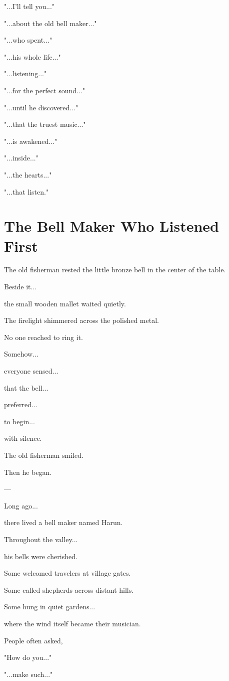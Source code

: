 \documentclass[12pt,openany]{book}
\begin{document}
"...I'll tell you..."

"...about the old bell maker..."

"...who spent..."

"...his whole life..."

"...listening..."

"...for the perfect sound..."

"...until he discovered..."

"...that the truest music..."

"...is awakened..."

"...inside..."

"...the hearts..."

"...that listen."
\section*{The Bell Maker Who Listened First}

The old fisherman rested the little bronze bell in the center of the table.

Beside it...

the small wooden mallet waited quietly.

The firelight shimmered across the polished metal.

No one reached to ring it.

Somehow...

everyone sensed...

that the bell...

preferred...

to begin...

with silence.

The old fisherman smiled.

Then he began.

---

Long ago...

there lived a bell maker named Harun.

Throughout the valley...

his bells were cherished.

Some welcomed travelers at village gates.

Some called shepherds across distant hills.

Some hung in quiet gardens...

where the wind itself became their musician.

People often asked,

"How do you..."

"...make such..."
\end{document}

